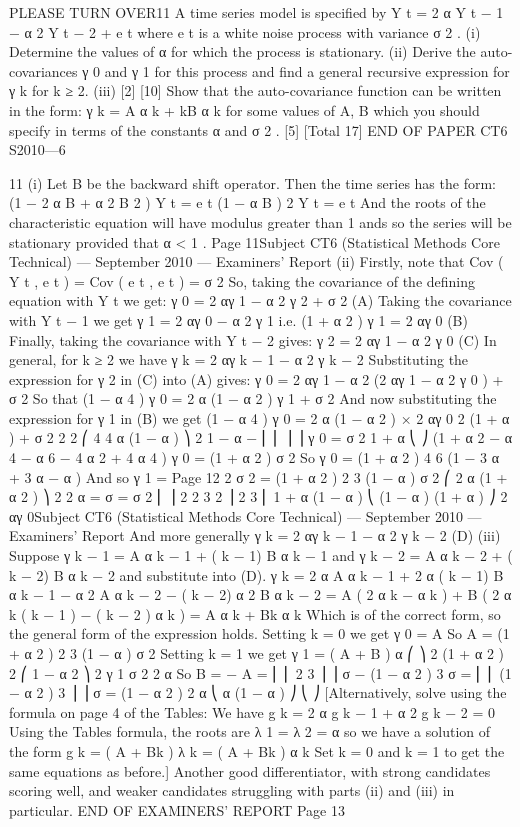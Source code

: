 PLEASE TURN OVER11
A time series model is specified by
Y t = 2 α Y t − 1 − α 2 Y t − 2 + e t
where e t is a white noise process with variance σ 2 .
(i) Determine the values of α for which the process is stationary.
(ii) Derive the auto-covariances γ 0 and γ 1 for this process and find a general
recursive expression for γ k for k ≥ 2.
(iii)
[2]
[10]
Show that the auto-covariance function can be written in the form:
γ k = A α k + kB α k
for some values of A, B which you should specify in terms of the constants α
and σ 2 .
[5]
[Total 17]
END OF PAPER
CT6 S2010—6

11
(i)
Let B be the backward shift operator. Then the time series has the form:
(1 − 2 α B + α 2 B 2 ) Y t = e t
(1 − α B ) 2 Y t = e t
And the roots of the characteristic equation will have modulus greater than 1
ands so the series will be stationary provided that α < 1 .
Page 11Subject CT6 (Statistical Methods Core Technical) — September 2010 — Examiners’ Report
(ii)
Firstly, note that Cov ( Y t , e t ) = Cov ( e t , e t ) = σ 2
So, taking the covariance of the defining equation with Y t we get:
γ 0 = 2 αγ 1 − α 2 γ 2 + σ 2 (A)
Taking the covariance with Y t − 1 we get
γ 1 = 2 αγ 0 − α 2 γ 1
i.e. (1 + α 2 ) γ 1 = 2 αγ 0
(B)
Finally, taking the covariance with Y t − 2 gives:
γ 2 = 2 αγ 1 − α 2 γ 0 (C)
In general, for k ≥ 2 we have γ k = 2 αγ k − 1 − α 2 γ k − 2
Substituting the expression for γ 2 in (C) into (A) gives:
γ 0 = 2 αγ 1 − α 2 (2 αγ 1 − α 2 γ 0 ) + σ 2
So that
(1 − α 4 ) γ 0 = 2 α (1 − α 2 ) γ 1 + σ 2
And now substituting the expression for γ 1 in (B) we get
(1 − α 4 ) γ 0 = 2 α (1 − α 2 ) ×
2 αγ 0
2
(1 + α )
+ σ 2
2
2
⎛
4 4 α (1 − α ) ⎞
2
1
−
α
−
⎜ ⎜
⎟ ⎟ γ 0 = σ
2
1 + α
⎝
⎠
(1 + α 2 − α 4 − α 6 − 4 α 2 + 4 α 4 ) γ 0 = (1 + α 2 ) σ 2
So γ 0 =
(1 + α 2 )
4
6
(1 − 3 α + 3 α − α )
And so γ 1 =
Page 12
2
σ 2 =
(1 + α 2 )
2 3
(1 − α )
σ 2
⎛ 2 α (1 + α 2 ) ⎞ 2
2 α
=
σ
=
σ 2
⎜
⎟
2
2 3
2 ⎟
2 3
⎜
1 + α
(1 − α )
⎝ (1 − α ) (1 + α ) ⎠
2 αγ 0Subject CT6 (Statistical Methods Core Technical) — September 2010 — Examiners’ Report
And more generally γ k = 2 αγ k − 1 − α 2 γ k − 2 (D)
(iii)
Suppose γ k − 1 = A α k − 1 + ( k − 1) B α k − 1 and γ k − 2 = A α k − 2 + ( k − 2) B α k − 2 and
substitute into (D).
γ k = 2 α A α k − 1 + 2 α ( k − 1) B α k − 1 − α 2 A α k − 2 − ( k − 2) α 2 B α k − 2
= A ( 2 α k − α k ) + B ( 2 α k ( k − 1 ) − ( k − 2 ) α k ) = A α k + Bk α k
Which is of the correct form, so the general form of the expression holds.
Setting k = 0 we get γ 0 = A
So A =
(1 + α 2 )
2 3
(1 − α )
σ 2
Setting k = 1 we get γ 1 = ( A + B ) α
⎛
⎞ 2 (1 + α 2 ) 2 ⎛ 1 − α 2 ⎞ 2
γ 1
σ 2
2 α
So B = − A = ⎜ ⎜
2 3 ⎟
⎟ σ − (1 − α 2 ) 3 σ = ⎜ ⎜ (1 − α 2 ) 3 ⎟ ⎟ σ = (1 − α 2 ) 2
α
⎝ α (1 − α ) ⎠
⎝
⎠
[Alternatively, solve using the formula on page 4 of the Tables:
We have g k = 2 α g k − 1 + α 2 g k − 2 = 0
Using the Tables formula, the roots are λ 1 = λ 2 = α so we have a solution
of the form g k = ( A + Bk ) λ k = ( A + Bk ) α k
Set k = 0 and k = 1 to get the same equations as before.]
Another good differentiator, with strong candidates scoring well, and weaker candidates
struggling with parts (ii) and (iii) in particular.
END OF EXAMINERS’ REPORT
Page 13
